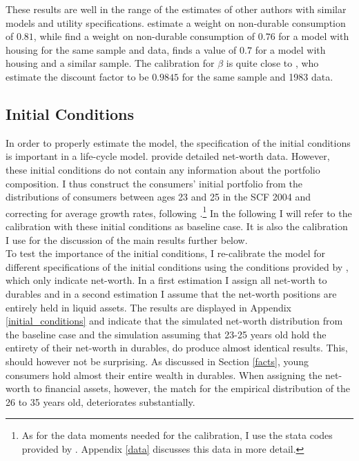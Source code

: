 \documentclass[a4paper,12pt,legno]{article}
\begin{document}
These results are well in the range of the estimates of other authors with similar models and utility specifications. \cite{FV&K2011} estimate a weight on non-durable consumption of $0.81$, while \cite{hintermaier2016} find a weight on non-durable consumption of $0.76$ for a model with housing for the same sample and data, \cite{gruber2003precautionary} finds a value of $0.7$ for a model with housing and a similar sample.
The calibration for $\beta$ is quite close to \cite{hintermaier2011}, who estimate the discount factor to be $0.9845$ for the same sample and 1983 data. 

\subsection{Initial Conditions}
In order to properly estimate the model, the specification of the initial conditions is important in a life-cycle model. \cite{hintermaier2011} provide detailed net-worth data. However, these initial conditions do not contain any information about the portfolio composition. I thus construct the consumers' initial portfolio from the distributions of consumers between ages 23 and 25 in the SCF 2004 and correcting for average growth rates, following \cite{hintermaier2011}.\footnote{As for the data moments needed for the calibration, I use the stata codes provided by \cite{hintermaier2016}. Appendix \ref{data} discusses this data in more detail.} In the following I will refer to the calibration with these initial conditions as baseline case. It is also the calibration I use for the discussion of the main results further below.\\
To test the importance of the initial conditions, I re-calibrate the model for different specifications of the initial conditions using the conditions provided by \cite{hintermaier2011}, which only indicate net-worth. In a first estimation I assign all net-worth to durables and in a second estimation I assume that the net-worth positions are entirely held in liquid assets. The results are displayed in Appendix \ref{initial_conditions} and indicate that the simulated net-worth distribution from the baseline case and the simulation assuming that 23-25 years old hold the entirety of their net-worth in durables, do produce almost identical results. This, should however not be surprising. As discussed in Section \ref{facts}, young consumers hold almost their entire wealth in durables. When assigning the net-worth to financial assets, however, the match for the empirical distribution of the 26 to 35 years old, deteriorates substantially.    
\end{document}
